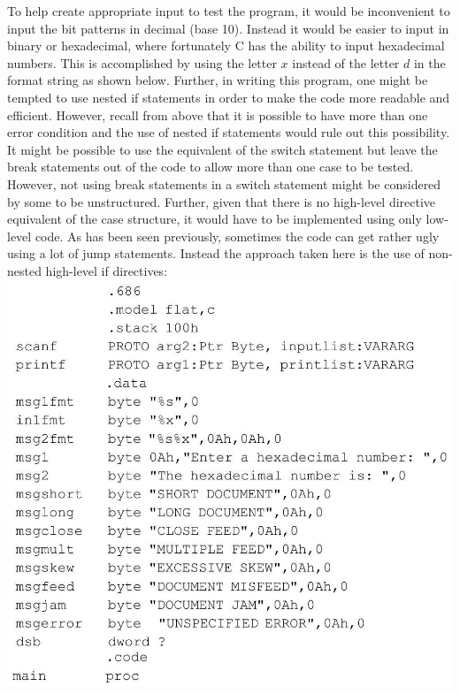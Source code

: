\documentclass[10pt]{article}
\begin{document}
To help create appropriate input to test the program, it would be inconvenient to input the bit patterns in decimal (base 10). Instead it would be easier to input in binary or hexadecimal, where fortunately C has the ability to input hexadecimal numbers. This is accomplished by using the letter $x$ instead of the letter $d$ in the format string as shown below. Further, in writing this program, one might be tempted to use nested if statements in order to make the code more readable and efficient. However, recall from above that it is possible to have more than one error condition and the use of nested if statements would rule out this possibility. It might be possible to use the equivalent of the switch statement but leave the break statements out of the code to allow more than one case to be tested. However, not using break statements in a switch statement might be considered by some to be unstructured. Further, given that there is no high-level directive equivalent of the case structure, it would have to be implemented using only low-level code. As has been seen previously, sometimes the code can get rather ugly using a lot of jump statements. Instead the approach taken here is the use of non-nested high-level if directives:\\
\includegraphics[max width=\textwidth, center]{2025_03_24_ebe50cc223a6fbc49eecg-131}
\end{document}
